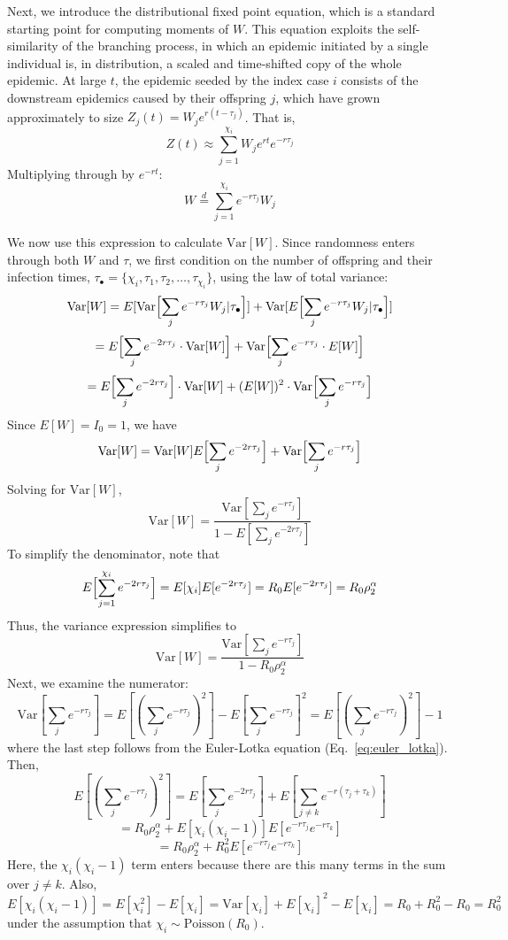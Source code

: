 Next, we introduce the distributional fixed point equation, which is a standard starting point for computing moments of $W$. This equation exploits the self-similarity of the branching process, in which an epidemic initiated by a single individual is, in distribution, a scaled and time-shifted copy of the whole epidemic. At large $t$, the epidemic seeded by the index case $i$ consists of the downstream epidemics caused by their offspring $j$, which have grown approximately to size $Z_j(t) = W_j e^{r(t - \tau_j)}$. That is, 
%
\[
	Z(t) \approx \sum_{j=1}^{\chi_i} W_j e^{rt} e^{-r \tau_j}
\]
Multiplying through by $e^{-rt}$: 
%
\[  W \overset{d}{=} \sum_{j=1}^{\chi_i} e^{-r \tau_j} W_j \]

We now use this expression to calculate $\text{Var}[W]$. Since randomness enters through both $W$ and $\tau$, we first condition on the number of offspring and their infection times, $\tau_\bullet = \{ \chi_i, \tau_1, \tau_2, \dots, \tau_{\chi_i} \}$, using the law of total variance: 
%
\[ \text{Var}[W] = E[\text{Var}\Bigl[\sum_j e^{-r \tau_j} W_j | \tau_\bullet\Bigr]] + \text{Var}[E\Bigl[\sum_j e^{-r \tau_j} W_j | \tau_\bullet\Bigr]] \]
\[
=E\Bigl[ \sum_j e^{-2r\tau_j}  \cdot \text{Var}[W] \Bigr] + 
\text{Var} \Bigl[\sum_j e^{-r \tau_j} \cdot E[W] \Bigr]
\]
\[
= E\Bigl[\sum_j e^{-2 r \tau_j}\Bigr] \cdot \text{Var}[W] + 
(E[W])^2 \cdot \text{Var}\Bigl[\sum_j e^{-r \tau_j}\Bigr]
\]
%
Since $E[W] = I_0 = 1$, we have 
\[
	\text{Var}[W] = \text{Var}[W] E\Bigl[\sum_j e^{-2 r \tau_j}\Bigr] + \text{Var}\Bigl[\sum_j e^{-r \tau_j}\Bigr]
\]
Solving for $\text{Var}[W]$, 
\[
	\text{Var}[W] = \frac{\text{Var}[\sum_j e^{-r \tau_j}]}{1 - E[\sum_j e^{-2 r \tau_j}]}
\]
To simplify the denominator, note that 
\[ 
E\Bigl[\sum_{j=1}^{\chi_i} e^{-2 r \tau_j}\Bigr] = E[\chi_i] E[e^{-2 r \tau_j}]
 = R_0 E[e^{-2 r \tau_j}]
 = R_0 \rho_2^\alpha 
 \]
Thus, the variance expression simplifies to 
\[
	\text{Var}[W] = \frac{\text{Var}[\sum_j e^{-r \tau_j}]}{1 - R_0 \rho_2^\alpha}
\]
Next, we examine the numerator: 
\[
	\text{Var}[\sum_j e^{-r \tau_j}] = E[(\sum_j e^{-r \tau_j})^2] - E[\sum_j e^{-r \tau_j}]^2 = E[(\sum_j e^{-r \tau_j})^2] - 1
\]
where the last step follows from the Euler-Lotka equation (Eq.~\ref{eq:euler_lotka}). 
Then, 
\[
	E[(\sum_j e^{- r \tau_j})^2] = E[\sum_j e^{-2 r \tau_j}] + E[\sum_{j \neq k} e^{-r (\tau_j + \tau_k)}]
\]
\[= R_0 \rho_2^\alpha + E[\chi_i (\chi_i - 1)] E[e^{-r \tau_j} e^{-r \tau_k}]\]
\[= R_0 \rho_2^\alpha + R_0^2 E[e^{-r \tau_j} e^{-r \tau_k}]\]
Here, the $\chi_i (\chi_i - 1)$ term enters because there are this many terms in the sum over $j \neq k$. Also, 
\[
E[\chi_i (\chi_i - 1)] = E[\chi_i^2] - E[\chi_i] = \text{Var}[\chi_i] + E[\chi_i]^2 - E[\chi_i] = R_0 + R_0^2 - R_0 = R_0^2
\]
under the assumption that $\chi_i \sim \text{Poisson}(R_0)$. 

